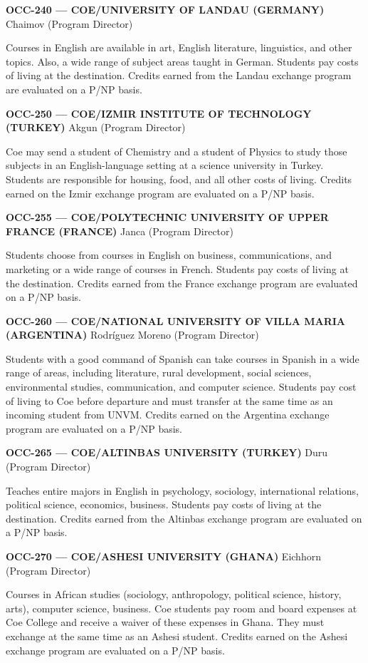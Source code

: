 \documentclass[
  letterpaper,
]{scrbook}
\begin{document}
\textbf{OCC-240 --- COE/UNIVERSITY OF LANDAU (GERMANY)} Chaimov (Program
Director)

Courses in English are available in art, English literature,
linguistics, and other topics. Also, a wide range of subject areas
taught in German. Students pay costs of living at the destination.
Credits earned from the Landau exchange program are evaluated on a P/NP
basis.

\textbf{OCC-250 --- COE/IZMIR INSTITUTE OF TECHNOLOGY (TURKEY)} Akgun
(Program Director)

Coe may send a student of Chemistry and a student of Physics to study
those subjects in an English-language setting at a science university in
Turkey. Students are responsible for housing, food, and all other costs
of living. Credits earned on the Izmir exchange program are evaluated on
a P/NP basis.

\textbf{OCC-255 --- COE/POLYTECHNIC UNIVERSITY OF UPPER FRANCE (FRANCE)}
Janca (Program Director)

Students choose from courses in English on business, communications, and
marketing or a wide range of courses in French. Students pay costs of
living at the destination. Credits earned from the France exchange
program are evaluated on a P/NP basis.

\textbf{OCC-260 --- COE/NATIONAL UNIVERSITY OF VILLA MARIA (ARGENTINA)}
Rodríguez Moreno (Program Director)

Students with a good command of Spanish can take courses in Spanish in a
wide range of areas, including literature, rural development, social
sciences, environmental studies, communication, and computer science.
Students pay cost of living to Coe before departure and must transfer at
the same time as an incoming student from UNVM. Credits earned on the
Argentina exchange program are evaluated on a P/NP basis.

\textbf{OCC-265 --- COE/ALTINBAS UNIVERSITY (TURKEY)} Duru (Program
Director)

Teaches entire majors in English in psychology, sociology, international
relations, political science, economics, business. Students pay costs of
living at the destination. Credits earned from the Altinbas exchange
program are evaluated on a P/NP basis.

\textbf{OCC-270 --- COE/ASHESI UNIVERSITY (GHANA)} Eichhorn (Program
Director)

Courses in African studies (sociology, anthropology, political science,
history, arts), computer science, business. Coe students pay room and
board expenses at Coe College and receive a waiver of these expenses in
Ghana. They must exchange at the same time as an Ashesi student. Credits
earned on the Ashesi exchange program are evaluated on a P/NP basis.
\end{document}
